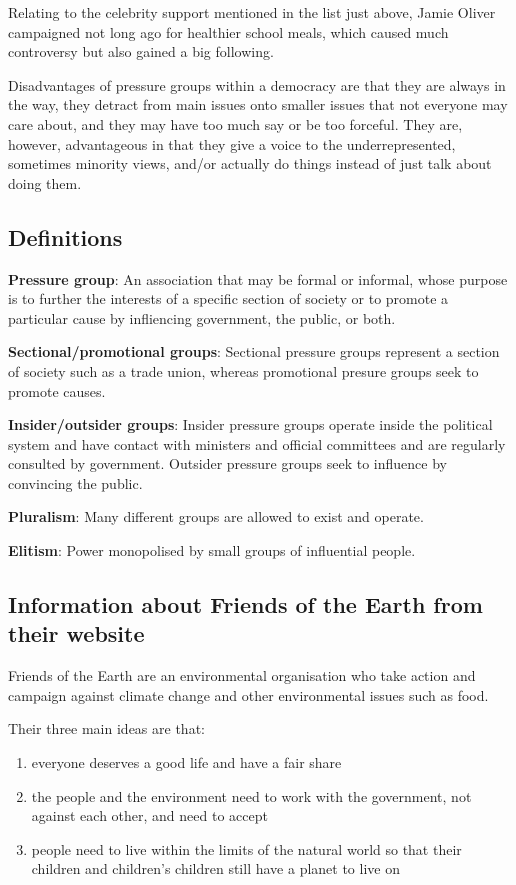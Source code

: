 \documentclass[12pt]{article}
\begin{document}
Relating to the celebrity support mentioned in the list just above, Jamie
Oliver campaigned not long ago for healthier school meals, which caused
much controversy but also gained a big following.

Disadvantages of pressure groups within a democracy are that they are
always in the way, they detract from main issues onto smaller issues that
not everyone may care about, and they may have too much say or be too
forceful.  They are, however, advantageous in that they give a voice to the
underrepresented, sometimes minority views, and/or actually do things
instead of just talk about doing them.

\subsection*{Definitions}

\textbf{Pressure group}: An association that may be formal or informal,
			 whose purpose is to further the interests of a
			 specific section of society or to promote a
			 particular cause by infliencing government, 
			 the public, or both.

\textbf{Sectional/promotional groups}: Sectional pressure groups represent
				       a section of society such as a trade
				       union, whereas promotional presure
				       groups seek to promote causes. 

\textbf{Insider/outsider groups}: Insider pressure groups operate inside
				  the political system and have contact
				  with ministers and official committees
				  and are regularly consulted by
				  government.  Outsider pressure groups
				  seek to influence by convincing the
				  public.

\textbf{Pluralism}: Many different groups are allowed to exist and operate.

\textbf{Elitism}: Power monopolised by small groups of influential people. 

\subsection*{Information about Friends of the Earth from their website}

Friends of the Earth are an environmental organisation who take action and
campaign against climate change and other environmental issues such as food.

Their three main ideas are that:

\begin{enumerate}
	\item{everyone deserves a good life and have a fair share}
	\item{the people and the environment need to work with the
	      government, not against each other, and need to accept}
	\item{people need to live within the limits of the natural world so
	      that their children and children's children still have a
	      planet to live on}
\end{enumerate}
\end{document}
